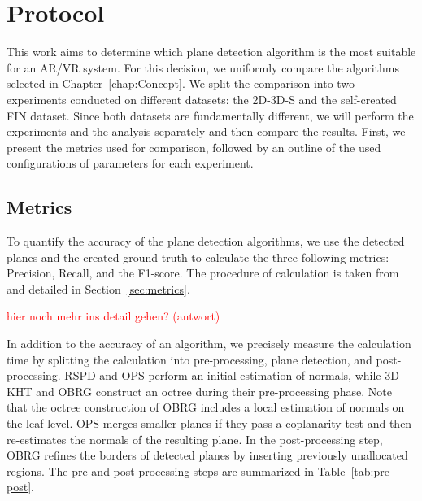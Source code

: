 \documentclass[main.tex]{subfiles}
\begin{document}
\section{Protocol}
This work aims to determine which plane detection algorithm is the most suitable for an AR/VR system. For this decision, we uniformly compare the algorithms selected in
Chapter~\ref{chap:Concept}. We split the comparison into two experiments conducted on different datasets: the 2D-3D-S and the
self-created FIN dataset. Since both datasets are fundamentally different, we will perform the experiments and the analysis separately and then compare the results.
First, we present the metrics used for comparison, followed by an outline of the used configurations of parameters for each experiment.

\subsection{Metrics}
To quantify the accuracy of the plane detection algorithms, we use the detected planes and the created ground truth to calculate the three following
metrics: Precision, Recall, and the F1-score. The procedure of calculation is taken from~\cite[Section~4]{Araújo_Oliveira_2020} and detailed
in Section~\ref{sec:metrics}.


\textcolor{red}{hier noch mehr ins detail gehen? (antwort) \underline{\hspace{2cm}}}


In addition to the accuracy of an algorithm, we precisely measure the calculation time by splitting the calculation into pre-processing, plane
detection, and post-processing.
RSPD and OPS perform an initial estimation of normals, while 3D-KHT and OBRG construct an octree during their
pre-processing phase. Note that the octree construction of OBRG includes a local estimation of normals on the
leaf level. OPS merges smaller planes if they pass a coplanarity test and then re-estimates the normals of the
resulting plane. In the post-processing step, OBRG refines the borders of detected planes by inserting
previously unallocated regions.
The pre-and post-processing steps are summarized in Table~\ref{tab:pre-post}.
\end{document}
